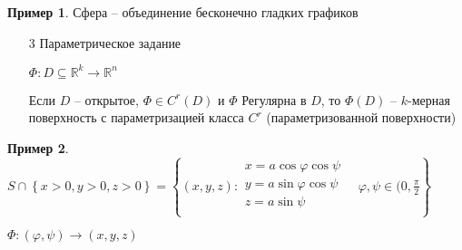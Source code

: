 \documentclass{book}
\newcommand\R{\ensuremath{\mathbb{R}}}
\theoremstyle{definition}
\newtheorem*{example}{Пример}
\begin{document}
\begin{example}
    Сфера -- объединение бесконечно гладких графиков
\end{example}

\begin{enumerate}
    \item [3] Параметрическое задание

        $\Phi: D\subseteq \R^k\to \R^n$

        Если $D$ -- открытое,  $\Phi\in C^r(D)$ и $\Phi$ Регулярна в  $D$, то  $\Phi(D)$ -- $k$-мерная поверхность с параметризацией класса  $C^r$  (параметризованной поверхности)
\end{enumerate}

\begin{example}
    $S \cap \left\{ x>0, y>0, z>0 \right\}  = \left\{ (x,y,z): 
    \begin{matrix}
        x = a\cos \varphi\cos \psi\\
        y = a\sin\varphi\cos \psi\\
        z = a\sin \psi\\
\end{matrix}\quad \varphi, \psi\in (0, \frac{\pi}{2} \right\} $ 

$\Phi: \left( \varphi, \psi \right) \to \left( x, y, z \right) $
\end{example}
\end{document}
